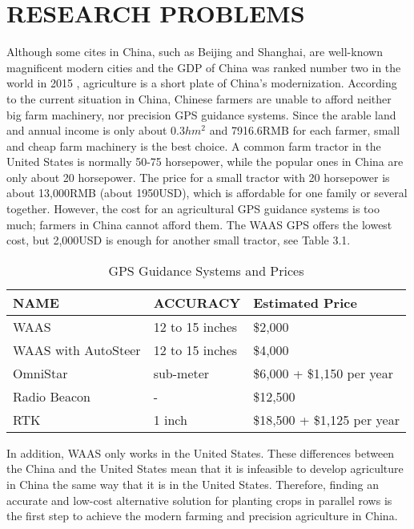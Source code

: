 \chapter{RESEARCH PROBLEMS}


Although some cites in China, such as Beijing and Shanghai, are well-known magnificent modern cities and the GDP of China was ranked number two in the world in 2015 \cite{GDP2015}, agriculture is a short plate of China's modernization. According to the current situation in China, Chinese farmers are unable to afford neither big farm machinery, nor precision GPS guidance systems. Since the arable land and annual income is only about 0.3$hm^{2}$ and 7916.6RMB for each farmer, small and cheap farm machinery is the best choice. A common farm tractor in the United States is normally 50-75 horsepower, while the popular ones in China are only about 20 horsepower. The price for a small tractor with 20 horsepower is about 13,000RMB (about 1950USD), which is affordable for one family or several together. However, the cost for an agricultural GPS guidance systems is too much; farmers in China cannot afford them. The WAAS GPS offers the lowest cost, but 2,000USD is enough for another small tractor, see Table 3.1.
\begin{table}[ht!]
\caption{GPS Guidance Systems and Prices \cite{PriceR}}
\begin{center}	
\begin{tabular}{|l|l|l|}
\hline
NAME & ACCURACY & Estimated Price \\ 
\hline
WAAS & 12 to 15 inches & \$2,000 \\
\hline
WAAS with AutoSteer &  12 to 15 inches & \$4,000\\
\hline
OmniStar & sub-meter & \$6,000 + \$1,150 per year\\
\hline
Radio Beacon & - & \$12,500\\
\hline
RTK & 1 inch & \$18,500 + \$1,125 per year\\
\hline
\end{tabular}
\end{center}					
\end{table}

In addition, WAAS only works in the United States. These differences between the China and the United States mean that it is infeasible to develop agriculture in China the same way that it is in the United States. Therefore, finding an accurate and low-cost alternative solution for planting crops in parallel rows is the first step to achieve the modern farming and precision agriculture in China.

